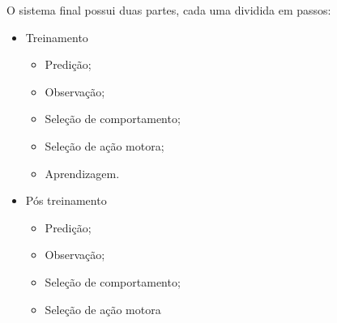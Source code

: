 \documentclass{beamer}
\begin{document}
\begin{frame}
O sistema final possui duas partes, cada uma dividida em passos:\pause
\begin{itemize}
	\item Treinamento
	\begin{itemize}
		\item Predição;
		\item Observação;
		\item Seleção de comportamento;
		\item Seleção de ação motora;
		\item Aprendizagem.\pause
	\end{itemize}
	\item Pós treinamento
	\begin{itemize}
		\item Predição;
		\item Observação;
		\item Seleção de comportamento;
		\item Seleção de ação motora
	\end{itemize}
\end{itemize}
\end{frame}

\end{document}
